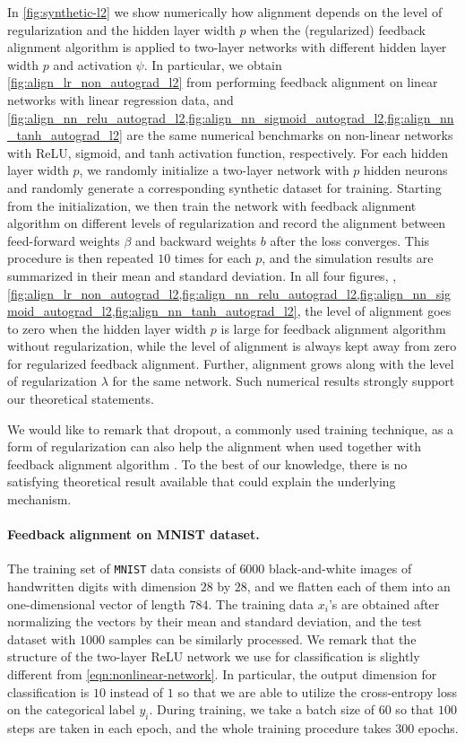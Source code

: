 In \cref{fig:synthetic-l2} we show numerically how alignment depends on the level of regularization and the hidden layer width $p$ when the (regularized) feedback alignment algorithm is applied to two-layer networks with different hidden layer width $p$ and activation $\psi$. In particular, we obtain \cref{fig:align_lr_non_autograd_l2} from performing feedback alignment on linear networks with linear regression data, and \cref{fig:align_nn_relu_autograd_l2,fig:align_nn_sigmoid_autograd_l2,fig:align_nn_tanh_autograd_l2} are the same numerical benchmarks on non-linear networks with ReLU, sigmoid, and tanh activation function, respectively. For each hidden layer width $p$, we randomly initialize a two-layer network with $p$ hidden neurons and randomly generate a corresponding synthetic dataset for training. Starting from the initialization, we then train the network with feedback alignment algorithm on different levels of regularization and record the alignment between feed-forward weights $\beta$ and backward weights $b$ after the loss converges. This procedure is then repeated $10$ times for each $p$, and the simulation results are summarized in their mean and standard deviation. In all four figures, \ie,  \cref{fig:align_lr_non_autograd_l2,fig:align_nn_relu_autograd_l2,fig:align_nn_sigmoid_autograd_l2,fig:align_nn_tanh_autograd_l2}, the level of alignment goes to zero when the hidden layer width $p$ is large for feedback alignment algorithm without regularization, while the level of alignment is always kept away from zero for regularized feedback alignment. Further, alignment grows along with the level of regularization $\lambda$ for the same network. Such numerical results strongly support our theoretical statements.

We would like to remark that dropout, a commonly used training technique, as a form of regularization can also help the alignment when used together with feedback alignment algorithm \citep{wager2013dropout}. To the best of our knowledge, there is no satisfying theoretical result available that could explain the underlying mechanism.


\paragraph{Feedback alignment on MNIST dataset.}

The training set of \texttt{MNIST} data consists of $6000$ black-and-white images of handwritten digits with dimension $28$ by $28$, and we flatten each of them into an one-dimensional vector of length $784$. The training data $x_i$'s are obtained after normalizing the vectors by their mean and standard deviation, and the test dataset with $1000$ samples can be similarly processed. We remark that the structure of the two-layer ReLU network we use for classification is slightly different from \eqref{eqn:nonlinear-network}. In particular, the output dimension for classification is $10$ instead of $1$ so that we are able to utilize the cross-entropy loss on the categorical label $y_i$. During training, we take a batch size of $60$ so that $100$ steps are taken in each epoch, and the whole training procedure takes $300$ epochs. 

